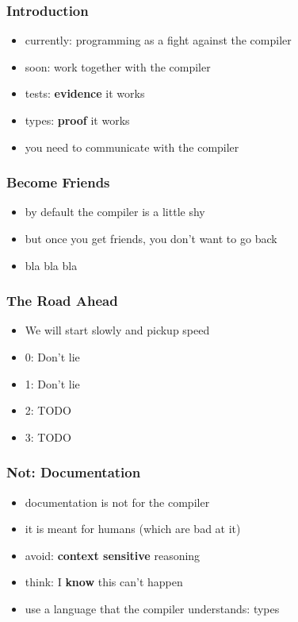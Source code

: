 \documentclass{beamer}
\begin{document}
\begin{frame}
  \frametitle{Introduction}
  \begin{itemize}
  \item currently: programming as a fight against the compiler
  \item soon: work together with the compiler
  \item tests: \textbf{evidence} it works
  \item types: \textbf{proof} it works
  \item you need to communicate with the compiler
  \end{itemize}
\end{frame}

\begin{frame}
  \frametitle{Become Friends}
  \begin{itemize}
  \item by default the compiler is a little shy
  \item but once you get friends, you don't want to go back
  \item bla bla bla
  \end{itemize}
\end{frame}

\begin{frame}
  \frametitle{The Road Ahead}
  \begin{itemize}
  \item We will start slowly and pickup speed
  \item 0: Don't lie
  \item 1: Don't lie
  \item 2: TODO
  \item 3: TODO
  \end{itemize}
\end{frame}

\begin{frame}
  \frametitle{Not: Documentation}
  \begin{itemize}
  \item documentation is not for the compiler
  \item it is meant for humans (which are bad at it)
  \item avoid: \textbf{context sensitive} reasoning
  \item think: I \textbf{know} this can't happen
  \item use a language that the compiler understands: types
  \end{itemize}
\end{frame}
\end{document}
